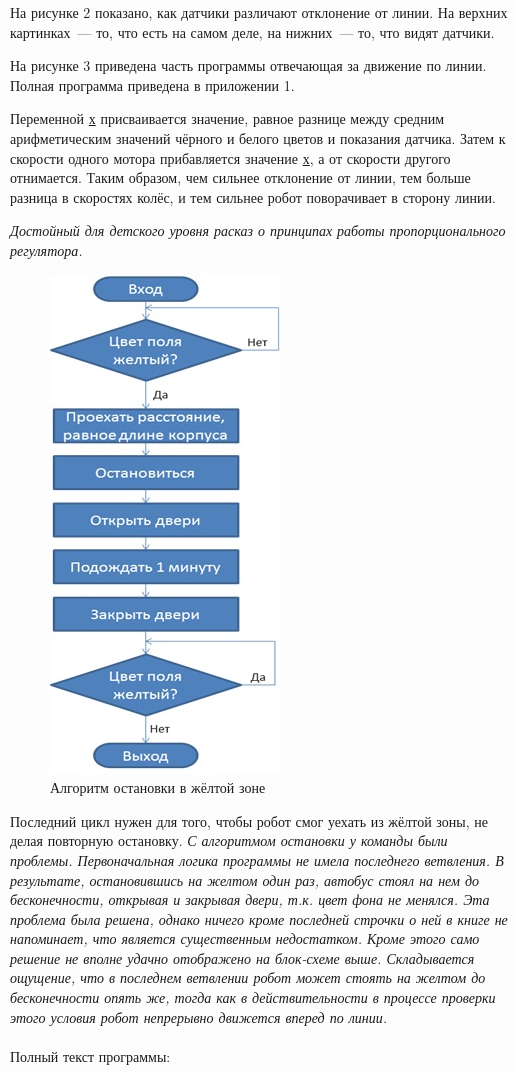 На рисунке 2 показано, как датчики различают отклонение от линии. На верхних картинках~--- то, что есть на самом деле, на нижних~--- то, что видят датчики.

На рисунке 3 приведена часть программы отвечающая за движение по линии. Полная программа приведена в приложении 1.

Переменной \underline{х} присваивается значение, равное разнице между средним арифметическим значений чёрного и белого цветов и показания датчика. Затем к скорости одного мотора прибавляется значение \underline{х}, а от скорости другого отнимается. Таким образом, чем сильнее отклонение от линии, тем больше разница в скоростях колёс, и тем сильнее робот поворачивает в сторону линии. 

{\slshape Достойный для детского уровня расказ о принципах работы пропорционального регулятора.}

\begin{figure}[h!]
	\begin{center}
		\includegraphics[width=0.4\linewidth]{chapters/chapter28/images/4}
		\caption{Алгоритм остановки в жёлтой зоне}
		\label{ris:image28x4}
	\end{center}
\end{figure}

Последний цикл нужен для того, чтобы робот смог уехать из жёлтой зоны, не делая повторную остановку.
\clearpage
{\slshape С алгоритмом остановки у команды были проблемы. Первоначальная логика программы не имела последнего ветвления. В результате, остановившись на желтом один раз, автобус стоял на нем до бесконечности, открывая и закрывая двери, т.к. цвет фона не менялся. Эта проблема была решена, однако ничего кроме последней строчки о ней в книге не напоминает, что является существенным недостатком. Кроме этого само решение не вполне удачно отображено на блок-схеме выше. Складывается ощущение, что в последнем ветвлении робот может стоять на желтом до бесконечности опять же, тогда как в действительности в процессе проверки этого условия робот непрерывно движется вперед по линии.}\\\\
Полный текст программы:

